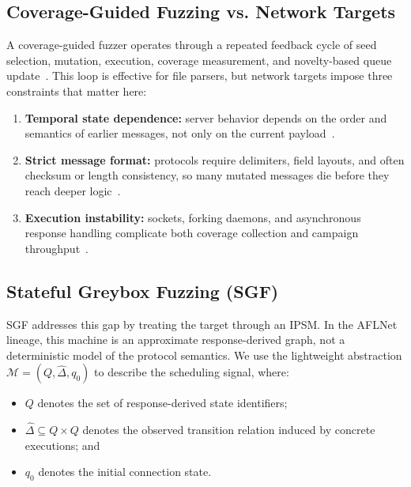 \documentclass[final,5p,times,number]{elsarticle}
\begin{document}
\subsection{Coverage-Guided Fuzzing vs. Network Targets}
A coverage-guided fuzzer operates through a repeated feedback cycle of seed selection, mutation, execution, coverage measurement, and novelty-based queue update~\cite{seed_selection_successful_fuzzing_2021,one_fuzzing_strategy_rule_2022,regression_greybox_fuzzing_2021,efficient_errors_2022}.
This loop is effective for file parsers, but network targets impose three constraints that matter here:
\begin{enumerate}
    \item \textbf{Temporal state dependence:} server behavior depends on the order and semantics of earlier messages, not only on the current payload~\cite{aflnet,stateafl,sgf_usenix22,formatted_stateful_greybox_fuzzing_2024}.
    \item \textbf{Strict message format:} protocols require delimiters, field layouts, and often checksum or length consistency, so many mutated messages die before they reach deeper logic~\cite{gramatron_effective_grammar_aware_2021,griffin_grammar_free_dbms_2022,formatted_stateful_greybox_fuzzing_2024}.
    \item \textbf{Execution instability:} sockets, forking daemons, and asynchronous response handling complicate both coverage collection and campaign throughput~\cite{snapfuzz_high_throughput_fuzzing_2022}.
\end{enumerate}

\subsection{Stateful Greybox Fuzzing (SGF)}
SGF addresses this gap by treating the target through an IPSM. In the AFLNet lineage, this machine is an approximate response-derived graph, not a deterministic model of the protocol semantics. We use the lightweight abstraction $\mathcal{M}=(Q,\widehat{\Delta},q_0)$ to describe the scheduling signal, where:
\begin{itemize}
    \item $Q$ denotes the set of response-derived state identifiers;
    \item $\widehat{\Delta}\subseteq Q\times Q$ denotes the observed transition relation induced by concrete executions; and
    \item $q_0$ denotes the initial connection state.
\end{itemize}
\end{document}

